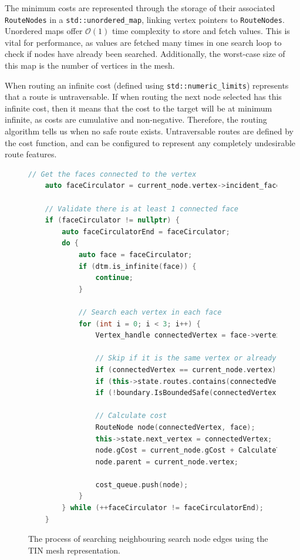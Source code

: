 \documentclass[12pt]{article}
\begin{document}
The minimum costs are represented through the storage of their associated \texttt{RouteNodes} in a \texttt{std::unordered\_map}, linking vertex pointers to \texttt{RouteNodes}. Unordered maps offer $\mathcal{O} (1)$ time complexity to store and fetch values. This is vital for performance, as values are fetched many times in one search loop to check if nodes have already been searched. Additionally, the worst-case size of this map is the number of vertices in the mesh.

When routing an infinite cost (defined using \texttt{std::numeric\_limits}) represents that a route is untraversable. If when routing the next node selected has this infinite cost, then it means that the cost to the target will be at minimum infinite, as costs are cumulative and non-negative. Therefore, the routing algorithm tells us when no safe route exists. Untraversable routes are defined by the cost function, and can be configured to represent any completely undesirable route features.

\begin{figure}[H]
  \centering
  \begin{lstlisting}[language=c++]
	// Get the faces connected to the vertex
	auto faceCirculator = current_node.vertex->incident_faces();

	// Validate there is at least 1 connected face
	if (faceCirculator != nullptr) {
		auto faceCirculatorEnd = faceCirculator;
		do {
			auto face = faceCirculator;
			if (dtm.is_infinite(face)) {
				continue;
			}

			// Search each vertex in each face
			for (int i = 0; i < 3; i++) {
				Vertex_handle connectedVertex = face->vertex(i);

				// Skip if it is the same vertex or already visited or out-of-bounds
				if (connectedVertex == current_node.vertex) { continue; }
				if (this->state.routes.contains(connectedVertex)) { continue; }
				if (!boundary.IsBoundedSafe(connectedVertex->point())) { continue; }

				// Calculate cost
				RouteNode node(connectedVertex, face);
				this->state.next_vertex = connectedVertex;
				node.gCost = current_node.gCost + CalculateTrivialCost(fm, this->state);
				node.parent = current_node.vertex;

				cost_queue.push(node);
			}
		} while (++faceCirculator != faceCirculatorEnd);
	}
\end{lstlisting}
  \caption{The process of searching neighbouring search node edges using the TIN mesh representation.}
  \label{fig:impl:search:edges}
\end{figure}
\end{document}
